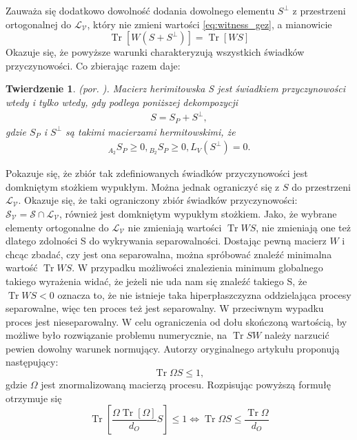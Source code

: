 \documentclass[10pt]{article} %
\newtheorem{tw}{Twierdzenie}
\DeclareMathOperator{\Trs}{Tr}
\begin{document}
Zauważa się dodatkowo dowolność dodania dowolnego elementu $S^\bot$ z przestrzeni ortogonalnej do $\mathcal{L_V}$, który nie zmieni wartości \eqref{eq:witness_gez}, a mianowicie
\begin{equation}
\Trs\left[W\left(S + S^\bot\right)\right] = \Trs\left[WS\right]
\end{equation}
Okazuje się, że powyższe warunki charakteryzują wszystkich świadków przyczynowości.
Co zbierając razem daje:
\begin{tw}
(por. \cite{causal_witness}).
Macierz herimitowska S jest świadkiem przyczynowości wtedy i tylko wtedy, gdy podlega poniższej dekompozycji
\begin{gather}
S = S_P + S^\bot,
\end{gather}
gdzie $S_P$ i $S^\bot$ są takimi macierzami hermitowskimi, że
\begin{gather}
{}_{A_2} S_P \geq 0, {}_{B_2} S_P \geq 0, L_V(S^\bot) = 0.
\end{gather}
\end{tw}
Pokazuje się, że zbiór tak zdefiniowanych świadków przyczynowości jest domkniętym stożkiem wypukłym. Można jednak ograniczyć się z $S$ do przestrzeni 
$\mathcal{L_V}$. Okazuje się, że taki ograniczony zbiór świadków przyczynowości: $\mathcal{S_V} = \mathcal{S} \cap \mathcal{L_V}$, również jest domkniętym wypukłym stożkiem. Jako, że wybrane elementy ortogonalne do
$\mathcal{L_V}$ nie zmieniają wartości $\Trs WS$, nie zmieniają one też dlatego zdolności S do wykrywania separowalności. 
Dostając pewną macierz $W$ i chcąc zbadać, czy jest ona separowalna, można spróbować znaleźć minimalna wartość $\Trs WS$. W przypadku możliwości 
znalezienia minimum globalnego takiego wyrażenia widać, że jeżeli nie uda nam się znaleźć takiego S, że $\Trs WS < 0$ oznacza to, że nie istnieje
taka hiperpłaszczyzna oddzielająca procesy separowalne, więc ten proces też jest separowalny. W przeciwnym wypadku proces jest nieseparowalny.
W celu ograniczenia od dołu skończoną wartością, by możliwe było rozwiązanie problemu numerycznie, na $\Trs SW$ należy narzucić pewien dowolny warunek normujący.
Autorzy oryginalnego artykułu proponują następujący:
\begin{equation}
\Trs \Omega S \leq 1,
\end{equation}
gdzie $\Omega$ jest znormalizowaną macierzą procesu.
Rozpisując powyższą formułę otrzymuje się
\begin{equation}
\Trs\left[ \frac{\Omega \Trs \left[ \Omega \right]}{d_O}S\right]\leq1 \iff \Trs \Omega S \leq \frac{\Trs \Omega}{d_O}
\end{equation}
\end{document}
